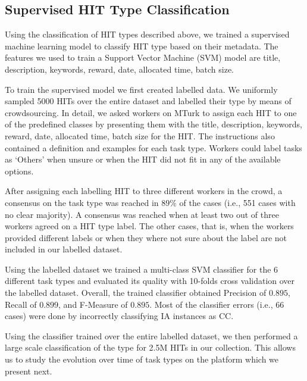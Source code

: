 \subsection{Supervised HIT Type Classification}
Using the classification of HIT types described above, we trained a supervised machine learning model to classify HIT type based on their metadata. The features we used to train a Support Vector Machine (SVM) model are title, description, keywords, reward, date, allocated time, batch size.

To train the supervised model we first created labelled data. We uniformly sampled 5000 HITs over the entire dataset and labelled their type by means of crowdsourcing. In detail, we asked workers on MTurk to assign each HIT to one of the predefined classes by presenting them with the title, description, keywords, reward, date, allocated time, batch size for the HIT. The instructions also contained a definition and examples for each task type. Workers could label tasks as `Others' when unsure or when the HIT did not fit in any of the available options.

After assigning each labelling HIT to three different workers in the crowd, a consensus on the task type was reached in $89\%$ of the cases (i.e., 551 cases with no clear majority). A consensus was reached when at least two out of three workers agreed on a HIT type label. The other cases, that is, when the workers provided different labels or when they where not sure about the label are not included in our labelled dataset.

Using the labelled dataset we trained a multi-class SVM classifier for the 6 different task types and evaluated its quality with 10-folds cross validation over the labelled dataset. Overall, the trained classifier obtained Precision of $0.895$, Recall of $0.899$, and F-Measure of $0.895$. Most of the classifier errors (i.e., 66 cases) were done by incorrectly classifying IA instances as CC.


Using the classifier trained over the entire labelled dataset, we then performed a large scale classification of the type for 2.5M HITs in our collection. This allows us to study the evolution over time of task types on the \amt{} platform which we present next.


